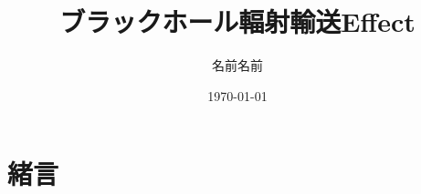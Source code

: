 \documentclass[uplatex, dvipdfmx, a4paper]{jsarticle}
\author{名前名前}
\title{ブラックホール輻射輸送Effect}
\date{\today}
\begin{document}
    \maketitle  

    \section{緒言}
\end{document}

